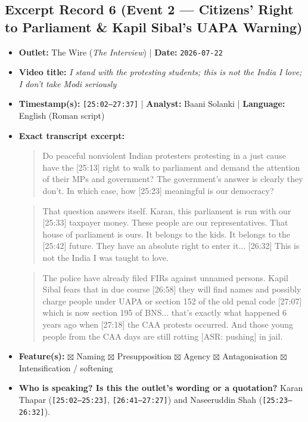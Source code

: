\documentclass[10pt,a4paper]{article}
\begin{document}
\subsection*{Excerpt Record 6 (Event 2 --- Citizens' Right to Parliament \& Kapil Sibal's UAPA Warning)}
\begin{itemize}[leftmargin=1.5em, itemsep=3pt, topsep=4pt]
  \item \textbf{Outlet:} The Wire (\textit{The Interview}) | \textbf{Date:} \texttt{2026-07-22}
  \item \textbf{Video title:} \textit{I stand with the protesting students; this is not the India I love; I don't take Modi seriously}
  \item \textbf{Timestamp(s):} \texttt{[25:02--27:37]} | \textbf{Analyst:} Baani Solanki | \textbf{Language:} English (Roman script)
  \item \textbf{Exact transcript excerpt:}
    \begin{quote}\small{} Do peaceful nonviolent Indian protesters protesting in a just cause have the [25:13] right to walk to parliament and demand the attention of their MPs and government? The government's answer is clearly they don't. In which case, how [25:23] meaningful is our democracy?\end{quote}
    \begin{quote}\small{} That question answers itself. Karan, this parliament is run with our [25:33] taxpayer money. These people are our representatives. That house of parliament is ours. It belongs to the kids. It belongs to the [25:42] future. They have an absolute right to enter it... [26:32] This is not the India I was taught to love.\end{quote}
    \begin{quote}\small{} The police have already filed FIRs against unnamed persons. Kapil Sibal fears that in due course [26:58] they will find names and possibly charge people under UAPA or section 152 of the old penal code [27:07] which is now section 195 of BNS... that's exactly what happened 6 years ago when [27:18] the CAA protests occurred. And those young people from the CAA days are still rotting [ASR: pushing] in jail.\end{quote}
  \item \textbf{Feature(s):} $\boxtimes$ Naming $\boxtimes$ Presupposition $\boxtimes$ Agency $\boxtimes$ Antagonisation $\boxtimes$ Intensification / softening
  \item \textbf{Who is speaking? Is this the outlet's wording or a quotation?} Karan Thapar (\texttt{[25:02--25:23]}, \texttt{[26:41--27:27]}) and Naseeruddin Shah (\texttt{[25:23--26:32]}).

\end{itemize}
\end{document}

